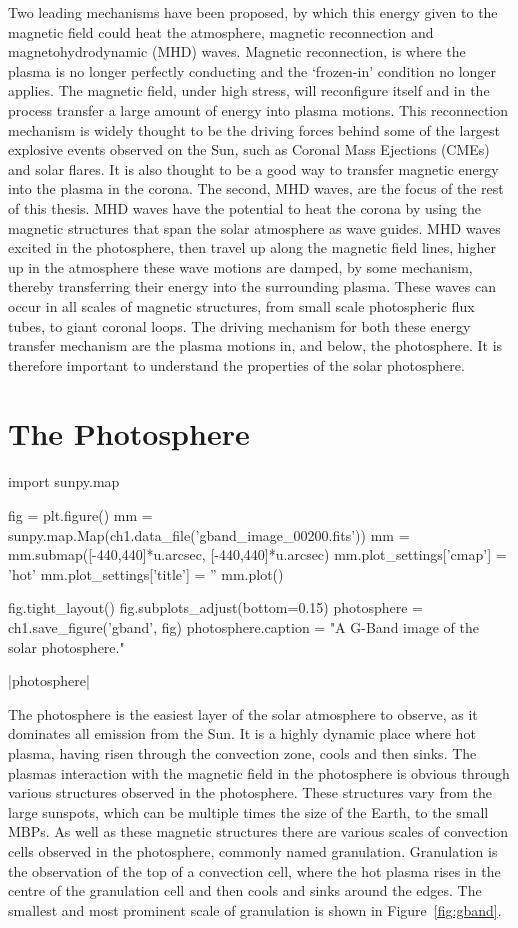 Two leading mechanisms have been proposed, by which this energy given to the magnetic field could heat the atmosphere, magnetic reconnection and magnetohydrodynamic (MHD) waves.
Magnetic reconnection, is where the plasma is no longer perfectly conducting and the `frozen-in' condition no longer applies.
The magnetic field, under high stress, will reconfigure itself and in the process transfer a large amount of energy into plasma motions.
This reconnection mechanism is widely thought to be the driving forces behind some of the largest explosive events observed on the Sun, such as Coronal Mass Ejections (CMEs) and solar flares.
It is also thought to be a good way to transfer magnetic energy into the plasma in the corona.
The second, MHD waves, are the focus of the rest of this thesis.
MHD waves have the potential to heat the corona by using the magnetic structures that span the solar atmosphere as wave guides.
MHD waves excited in the photosphere, then travel up along the magnetic field lines, higher up in the atmosphere these wave motions are damped, by some mechanism, thereby transferring their energy into the surrounding plasma.
These waves can occur in all scales of magnetic structures, from small scale photospheric flux tubes, to giant coronal loops.
The driving mechanism for both these energy transfer mechanism are the plasma motions in, and below, the photosphere.
It is therefore important to understand the properties of the solar photosphere.

\section{The Photosphere} 

\begin{pycode}[chapter1]
import sunpy.map

fig = plt.figure()
mm = sunpy.map.Map(ch1.data_file('gband_image_00200.fits'))
mm = mm.submap([-440,440]*u.arcsec, [-440,440]*u.arcsec)
mm.plot_settings['cmap'] = 'hot'
mm.plot_settings['title'] = ''
mm.plot()

fig.tight_layout()
fig.subplots_adjust(bottom=0.15)
photosphere = ch1.save_figure('gband', fig)
photosphere.caption = "A G-Band image of the solar photosphere."
\end{pycode}

\py[chapter1]|photosphere|

The photosphere is the easiest layer of the solar atmosphere to observe, as it dominates all emission from the Sun.
It is a highly dynamic place where hot plasma, having risen through the convection zone, cools and then sinks.
The plasmas interaction with the magnetic field in the photosphere is obvious through various structures observed in the photosphere.
These structures vary from the large sunspots, which can be multiple times the size of the Earth, to the small MBPs.
As well as these magnetic structures there are various scales of convection cells observed in the photosphere, commonly named granulation.
Granulation is the observation of the top of a convection cell, where the hot plasma rises in the centre of the granulation cell and then cools and sinks around the edges.
The smallest and most prominent scale of granulation is shown in Figure~\ref{fig:gband}.

